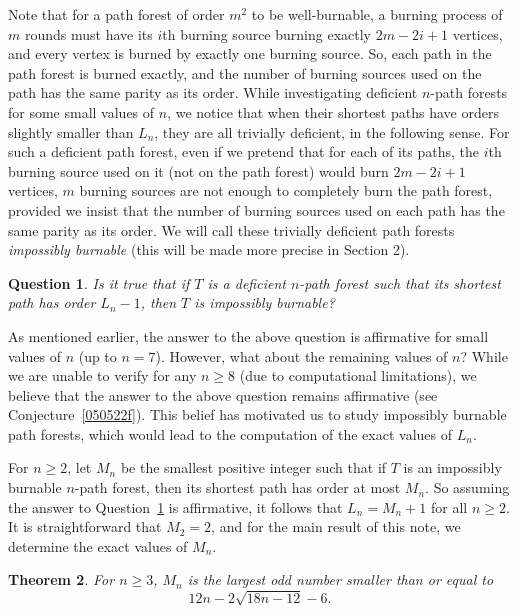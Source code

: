 \documentclass[
final
]{dmtcs-episciences}
\newtheorem{theorem}{Theorem}[section]
\newtheorem{question}[theorem]{Question}
\theoremstyle{definition}
\theoremstyle{remark}
\begin{document}
Note that for a path forest of order $m^2$ to be well-burnable, a burning process of $m$ rounds must have its $i$th burning source burning exactly $2m-2i+1$ vertices, and every vertex is burned by exactly one burning source.
So, each path in the path forest is burned exactly, and the number of burning sources used on the path has the same parity as its order.
While investigating deficient $n$-path forests for some small values of $n$, we notice that when their shortest paths have orders slightly smaller than $L_n$, they are all trivially deficient, in the following sense.
For such a deficient path forest, even if we pretend that for each of its paths, the $i$th burning source used on it (not on the path forest) would burn $2m-2i+1$ vertices, $m$ burning sources are not enough to completely burn the path forest, provided we insist that the number of burning sources used on each path has the same parity as its order.
We will call these trivially deficient path forests \emph{impossibly burnable} (this will be made more precise in Section 2).

\begin{question}\label{mainQuestion}
	Is it true that if $T$ is a deficient $n$-path forest such that its shortest path has order $L_n-1$, then $T$ is impossibly burnable?
\end{question}

As mentioned earlier, the answer to the above question is affirmative for small values of $n$ (up to $n=7$).
However, what about the remaining values of $n$?
While we are unable to verify for any $n\ge 8$ (due to computational limitations), we believe that the answer to the above question remains affirmative (see Conjecture~\ref{050522f}).
This belief has motivated us to study impossibly burnable path forests, which would lead to the computation of the exact values of $L_n$.

For $n\ge 2$, let $M_n$ be the smallest positive integer such that if $T$ is an impossibly burnable $n$-path forest, then its shortest path has order at most $M_n$.
So assuming the answer to Question~\ref{mainQuestion} is affirmative, it follows that $L_n = M_n + 1$ for all $n\ge 2$.
It is straightforward that $M_2 = 2$, and for the main result of this note, we determine the exact values of $M_n$.

\begin{theorem}\label{mainTheorem}
	For $n\ge 3$, $M_n$ is the largest odd number smaller than or equal to $$ 12n - 2\sqrt{18n - 12} - 6.$$
\end{theorem}
\end{document}
